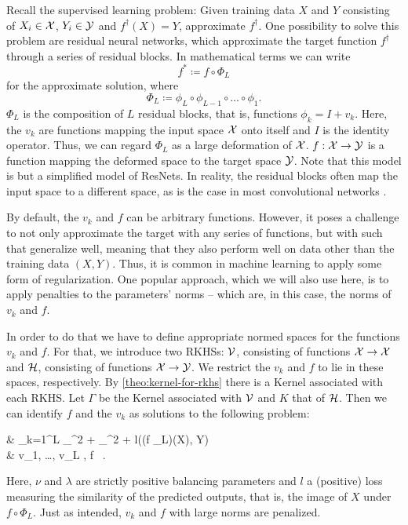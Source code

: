 Recall the supervised learning problem: Given training data $X$ and $Y$ consisting of $X_i \in \mathcal{X}$, $Y_i \in \mathcal{Y}$ and $f^\dagger(X) = Y$, approximate $f^\dagger$.
One possibility to solve this problem are residual neural networks, which approximate the target function $f^\dagger$ through a series of residual blocks.
In mathematical terms we can write
\begin{equation}
	f^\ast \coloneqq f \circ \Phi_L 
\end{equation}
for the approximate solution, where
\begin{equation}
	\label{eq:resnet-blocks}
	\Phi_L \coloneqq \phi_L \circ \phi_{L-1} \circ \ldots \circ \phi_1.
\end{equation} 
$\Phi_L$ is the composition of $L$ residual blocks, that is, functions $\phi_k = I + v_k$.
Here, the $v_k$ are functions mapping the input space $\mathcal{X}$ onto itself and $I$ is the identity operator.
Thus, we can regard $\Phi_L$ as a large deformation of $\mathcal{X}$.
$f: \mathcal{X} \to \mathcal{Y}$ is a function mapping the deformed space to the target space $\mathcal{Y}$.
Note that this model is but a simplified model of ResNets.
In reality, the residual blocks often map the input space to a different space, as is the case in most convolutional networks \cite{he16}.

By default, the $v_k$ and $f$ can be arbitrary functions.
However, it poses a challenge to not only approximate the target with any series of functions, but with such that generalize well, meaning that they also perform well on data other than the training data $(X, Y)$.
Thus, it is common in machine learning \cite{goodfellow16} to apply some form of regularization.
One popular approach, which we will also use here, is to apply penalties to the parameters' norms -- which are, in this case, the norms of $v_k$ and $f$.

In order to do that we have to define appropriate normed spaces for the functions $v_k$ and $f$.
For that, we introduce two RKHSs:
$\mathcal{V}$, consisting of functions $\mathcal{X} \rightarrow \mathcal{X}$ and $\mathcal{H}$, consisting of functions $\mathcal{X} \rightarrow \mathcal{Y}$.
We restrict the $v_k$ and $f$ to lie in these spaces, respectively.
By \cref{theo:kernel-for-rkhs} there is a Kernel associated with each RKHS.
Let $\Gamma$ be the Kernel associated with $\mathcal{V}$ and $K$ that of $\mathcal{H}$.
Then we can identify $f$ and the $v_k$ as solutions to the following problem:
\begin{problem}
	\label{prob:min-v-f}
	\begin{cases}
		 & \nu \cdot {} \sum_{k=1}^{L} _\cV^2
		+ \lambda {}_\cH^2 
		+ l((f \circ \Phi_L)(X), Y) \\
		 & v_1, \ldots, v_L \in \cV, f \in \cH \ .
	\end{cases}
\end{problem}
Here, $\nu$ and $\lambda$ are strictly positive balancing parameters and $l$ a (positive) loss measuring the similarity of the predicted outputs, that is, the image of $X$ under $f \circ \Phi_L$.
Just as intended, $v_k$ and $f$ with large norms are penalized.

